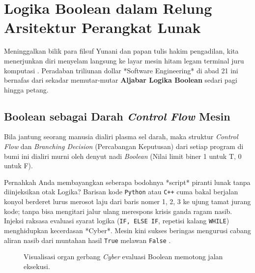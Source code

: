 \section{Logika Boolean dalam Relung Arsitektur Perangkat Lunak}

Meninggalkan bilik para filsuf Yunani dan papan tulis hakim pengadilan, kita menerjunkan diri menyelam langsung ke layar mesin hitam legam terminal juru komputasi \cite{levin_discrete,saylor_cs202}. Peradaban triliunan dollar *Software Engineering* di abad 21 ini bernafas dari sekadar memutar-mutar \textbf{Aljabar Logika Boolean} sedari pagi hingga petang.

\subsection{Boolean sebagai Darah \textit{Control Flow} Mesin}

Bila jantung seorang manusia dialiri plasma sel darah, maka struktur \textit{Control Flow} dan \textit{Branching Decision} (Percabangan Keputusan) dari setiap program di bumi ini dialiri murni oleh denyut nadi \textit{Boolean} (Nilai limit biner 1 untuk T, 0 untuk F). 

Pernahkah Anda membayangkan seberapa bodohnya *script* piranti lunak tanpa diinjeksikan otak Logika? Barisan kode \texttt{Python} atau \texttt{C++} cuma bakal berjalan konyol berderet lurus merosot laju dari baris nomer 1, 2, 3 ke ujung tamat jurang kode; tanpa bisa mengitari jalur ulang merespons krisis ganda ragam nasib. Injeksi raksasa evaluasi syarat logika (\texttt{IF, ELSE IF}, repetisi kalang \texttt{WHILE}) menghidupkan kecerdasan *Cyber*. Mesin kini sukses beringas mengurusi cabang aliran nasib dari muntahan hasil \texttt{True} melawan \texttt{False} \cite{levin_discrete}.

\begin{figure}[htbp]
\centering
{}
\caption{Visualisasi organ gerbang \textit{Cyber} evaluasi Boolean memotong jalan eksekusi.}
\label{fig:alur-boolean}
\end{figure}

